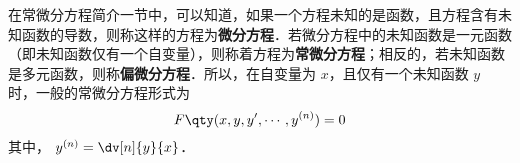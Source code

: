 
在常微分方程简介一节中，可以知道，如果一个方程未知的是函数，且方程含有未知函数的导数，则称这样的方程为\textbf{微分方程}．若微分方程中的未知函数是一元函数（即未知函数仅有一个自变量），则称着方程为\textbf{常微分方程}；相反的，若未知函数是多元函数，则称\textbf{偏微分方程}．所以，在自变量为 $x$，且仅有一个未知函数 $y$ 时，一般的常微分方程形式为
\begin{equation}
F\qty(x,y,y',\cdots,y^{(n)})=0
\end{equation}
其中， $y^{(n)}=\dv[n]{y}{x}$．